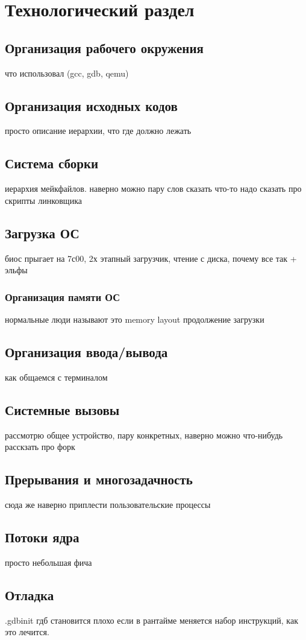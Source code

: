 \chapter{Технологический раздел}
\label{cha:impl}

\section{Организация рабочего окружения}
что использовал (gcc, gdb, qemu)

\section{Организация исходных кодов}
просто описание иерархии, что где должно лежать

\section{Система сборки}
иерархия мейкфайлов. наверно можно пару слов сказать
что-то надо сказать про скрипты линковщика

\section{Загрузка ОС}
биос прыгает на 7с00, 2х этапный загрузчик, чтение с диска, почему все так + эльфы

\subsection{Организация памяти ОС}
нормальные люди называют это memory layout
продолжение загрузки

\section{Организация ввода/вывода}
как общаемся с терминалом

\section{Системные вызовы}
рассмотрю общее устройство, пару конкретных, наверно можно что-нибудь расскзать про форк

\section{Прерывания и многозадачность}
сюда же наверно приплести пользовательские процессы

\section{Потоки ядра}
просто небольшая фича

\section{Отладка}
.gdbinit
гдб становится плохо если в рантайме меняется набор инструкций, как это лечится.
